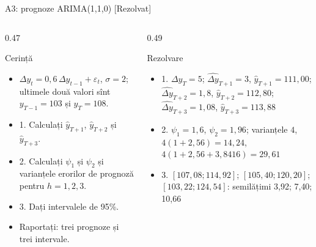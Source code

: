 \begin{frame}{A3: prognoze ARIMA(1,1,0) [Rezolvat]}
\itemsize{\scriptsize}
\begin{columns}[T]
\begin{column}{0.47\textwidth}
\begin{block}{Cerință}
\begin{itemize}
    \item $\Delta y_t = 0{,}6\,\Delta y_{t-1} + \varepsilon_t$, $\sigma = 2$; ultimele două valori sînt $y_{T-1} = 103$ și $y_T = 108$.
    \item 1. Calculați $\hat y_{T+1}$, $\hat y_{T+2}$ și $\hat y_{T+3}$.
    \item 2. Calculați $\psi_1$ și $\psi_2$ și varianțele erorilor de prognoză pentru $h = 1, 2, 3$.
    \item 3. Dați intervalele de 95\%.
    \item Raportați: trei prognoze și trei intervale.
\end{itemize}
\end{block}
\end{column}
\begin{column}{0.49\textwidth}
\begin{exampleblock}{Rezolvare}
\begin{itemize}
    \item 1. $\Delta y_T = 5$; $\widehat{\Delta y}_{T+1} = 3$, $\hat y_{T+1} = 111{,}00$; $\widehat{\Delta y}_{T+2} = 1{,}8$, $\hat y_{T+2} = 112{,}80$; $\widehat{\Delta y}_{T+3} = 1{,}08$, $\hat y_{T+3} = 113{,}88$
    \item 2. $\psi_1 = 1{,}6$, $\psi_2 = 1{,}96$; varianțele $4$, $4(1 + 2{,}56) = 14{,}24$, $4(1 + 2{,}56 + 3{,}8416) = 29{,}61$
    \item 3. $[107{,}08; 114{,}92]$; $[105{,}40; 120{,}20]$; $[103{,}22; 124{,}54]$: semilățimi 3{,}92; 7{,}40; 10{,}66
\end{itemize}
\end{exampleblock}
\end{column}
\end{columns}
\end{frame}

